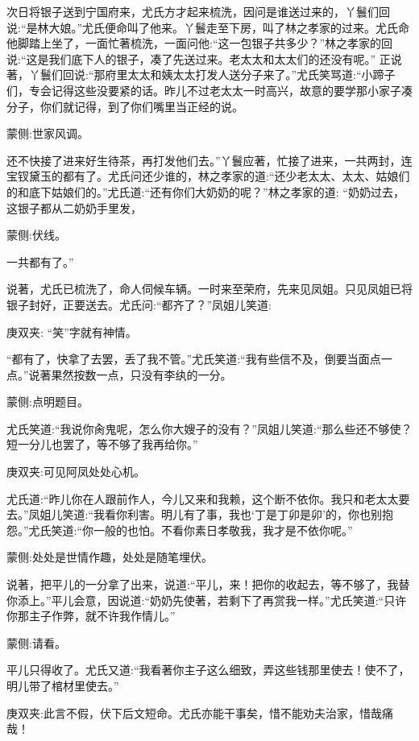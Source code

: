 \begin{parag}
    次日将银子送到宁国府来，尤氏方才起来梳洗，因问是谁送过来的，丫鬟们回说:“是林大娘。”尤氏便命叫了他来。丫鬟走至下房，叫了林之孝家的过来。尤氏命他脚踏上坐了，一面忙著梳洗，一面问他:“这一包银子共多少？”林之孝家的回说:“这是我们底下人的银子，凑了先送过来。老太太和太太们的还没有呢。” 正说著，丫鬟们回说:“那府里太太和姨太太打发人送分子来了。”尤氏笑骂道:“小蹄子们，专会记得这些没要紧的话。昨儿不过老太太一时高兴，故意的要学那小家子凑分子，你们就记得，到了你们嘴里当正经的说。\begin{note}蒙侧:世家风调。\end{note}还不快接了进来好生待茶，再打发他们去。”丫鬟应著，忙接了进来，一共两封，连宝钗黛玉的都有了。尤氏问还少谁的，林之孝家的道:“还少老太太、太太、姑娘们的和底下姑娘们的。”尤氏道:“还有你们大奶奶的呢？”林之孝家的道: “奶奶过去，这银子都从二奶奶手里发，\begin{note}蒙侧:伏线。\end{note}一共都有了。”
\end{parag}


\begin{parag}
    说著，尤氏已梳洗了，命人伺候车辆。一时来至荣府，先来见凤姐。只见凤姐已将银子封好，正要送去。尤氏问:“都齐了？”凤姐儿笑道:\begin{note}庚双夹: “笑”字就有神情。\end{note}“都有了，快拿了去罢，丢了我不管。”尤氏笑道:“我有些信不及，倒要当面点一点。”说著果然按数一点，只没有李纨的一分。\begin{note}蒙侧:点明题目。\end{note}尤氏笑道:“我说你肏鬼呢，怎么你大嫂子的没有？”凤姐儿笑道:“那么些还不够使？短一分儿也罢了，等不够了我再给你。”\begin{note}庚双夹:可见阿凤处处心机。\end{note}尤氏道:“昨儿你在人跟前作人，今儿又来和我赖，这个断不依你。我只和老太太要去。”凤姐儿笑道:“我看你利害。明儿有了事，我也‘丁是丁卯是卯’的，你也别抱怨。”尤氏笑道:“你一般的也怕。不看你素日孝敬我，我才是不依你呢。”\begin{note}蒙侧:处处是世情作趣，处处是随笔埋伏。\end{note}说著，把平儿的一分拿了出来，说道:“平儿，来！把你的收起去，等不够了，我替你添上。”平儿会意，因说道:“奶奶先使著，若剩下了再赏我一样。”尤氏笑道:“只许你那主子作弊，就不许我作情儿。”\begin{note}蒙侧:请看。\end{note}平儿只得收了。尤氏又道:“我看著你主子这么细致，弄这些钱那里使去！使不了，明儿带了棺材里使去。”\begin{note}庚双夹:此言不假，伏下后文短命。尤氏亦能干事矣，惜不能劝夫治家，惜哉痛哉！\end{note}
\end{parag}


